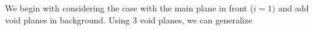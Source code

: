 We begin with considering the case with the main plane in front ($i=1)$ and add void planes in background. Using 3 void planes, we can generalize